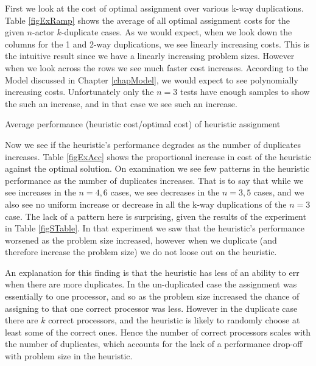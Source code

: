 First we look at the cost of optimal assignment over various k-way duplications.
Table \ref{figExRamp} shows the average of all optimal assignment costs for the given $n$-actor $k$-duplicate cases.
As we would expect, when we look down the columns for the 1 and 2-way duplications, we see linearly increasing costs.
This is the intuitive result since we have a linearly increasing problem sizes.
However when we look across the rows we see much faster cost increases.
According to the Model discussed in Chapter \ref{chapModel}, we would expect to see polynomially increasing costs.
Unfortunately only the $n = 3$ tests have enough samples to show the such an increase, and in that case we see such an increase.

\begin{table}
\begin{center}
	
\caption{Average performance (heuristic cost/optimal cost) of heuristic assignment}
\label{figExAcc}
\end{center}
\end{table}

Now we see if the heuristic's performance degrades as the number of duplicates increases.
Table \ref{figExAcc} shows the proportional increase in cost of the heuristic against the optimal solution.
On examination we see few patterns in the heuristic performance as the number of duplicates increases.
That is to say that while we see increases in the $n=4, 6$ cases, we see decreases in the $n=3, 5$ cases, and we also see no uniform increase or decrease in all the k-way duplications of the $n=3$ case.
The lack of a pattern here is surprising, given the results of the experiment in Table \ref{figSTable}.
In that experiment we saw that the heuristic's performance worsened as the problem size increased, however when we duplicate (and therefore increase the problem size) we do not loose out on the heuristic.

An explanation for this finding is that the heuristic has less of an ability to err when there are more duplicates.
In the un-duplicated case the assignment was essentially to one processor, and so as the problem size increased the chance of assigning to that one correct processor was less.
However in the duplicate case there are $k$ correct processors, and the heuristic is likely to randomly choose at least some of the correct ones.
Hence the number of correct processors scales with the number of duplicates, which accounts for the lack of a performance drop-off with problem size in the heuristic.

